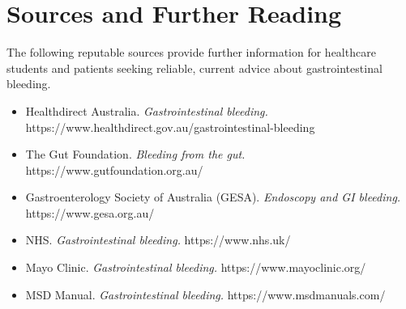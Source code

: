 \section*{Sources and Further Reading}
The following reputable sources provide further information for healthcare students and patients seeking reliable, current advice about gastrointestinal bleeding.
\begin{itemize}
    \item Healthdirect Australia. \textit{Gastrointestinal bleeding.} https://www.healthdirect.gov.au/gastrointestinal-bleeding
    \item The Gut Foundation. \textit{Bleeding from the gut.} https://www.gutfoundation.org.au/
    \item Gastroenterology Society of Australia (GESA). \textit{Endoscopy and GI bleeding.} https://www.gesa.org.au/
    \item NHS. \textit{Gastrointestinal bleeding.} https://www.nhs.uk/
    \item Mayo Clinic. \textit{Gastrointestinal bleeding.} https://www.mayoclinic.org/
    \item MSD Manual. \textit{Gastrointestinal bleeding.} https://www.msdmanuals.com/
\end{itemize}
